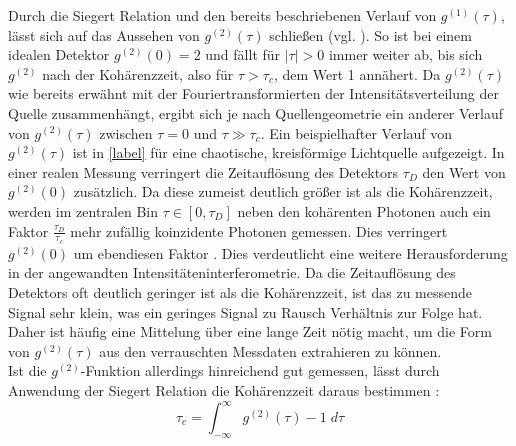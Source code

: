 Durch die Siegert Relation und den bereits beschriebenen Verlauf von $g^{(1)}(\tau)$, lässt sich auf das Aussehen von $g^{(2)}(\tau)$ schließen (vgl. \cite[Kap. 6.3]{foxQuantumOpticsIntroduction2006}). 
So ist bei einem idealen Detektor $g^{(2)}(0)=2$ und fällt für $|\tau|>0$ immer weiter ab, bis sich $g^{(2)}$ nach der Kohärenzzeit, also für $\tau>\tau_c$, dem Wert 1 annähert. 
Da $g^{(2)}(\tau)$ wie bereits erwähnt mit der Fouriertransformierten der Intensitätsverteilung der Quelle zusammenhängt, ergibt sich je nach Quellengeometrie ein anderer Verlauf von $g^{(2)}(\tau)$ zwischen $\tau=0$ und $\tau \gg \tau_c$. 
Ein beispielhafter Verlauf von $g^{(2)}(\tau)$ ist in \autoref{label} für eine chaotische, kreisförmige Lichtquelle aufgezeigt. 
In einer realen Messung verringert die Zeitauflösung des Detektors $\tau_D$ den Wert von $g^{(2)}(0)$ zusätzlich. 
Da diese zumeist deutlich größer ist als die Kohärenzzeit, werden im zentralen Bin $\tau \in [0, \tau_D]$ neben den kohärenten Photonen auch ein Faktor $\frac{\tau_D}{\tau_c}$ mehr zufällig koinzidente Photonen gemessen. 
Dies verringert $g^{(2)}(0)$ um ebendiesen Faktor \cite[Kap. 14.7]{mandelOpticalCoherenceQuantum1995}. 
Dies verdeutlicht eine weitere Herausforderung in der angewandten Intensitäteninterferometrie. 
Da die Zeitauflösung des Detektors oft deutlich geringer ist als die Kohärenzzeit, ist das zu messende Signal sehr klein, was ein geringes Signal zu Rausch Verhältnis zur Folge hat. 
Daher ist häufig eine Mittelung über eine lange Zeit nötig macht, um die Form von $g^{(2)}(\tau)$ aus den verrauschten Messdaten extrahieren zu können.\\ 

Ist die $g^{(2)}$-Funktion allerdings hinreichend gut gemessen, lässt durch Anwendung der Siegert Relation die Kohärenzzeit daraus bestimmen \cite[Eq. 14.7-2]{mandelOpticalCoherenceQuantum1995}:
\begin{equation}
    \tau_c = \int_{-\infty}^{\infty} g^{(2)}(\tau) - 1\;d\tau
\end{equation}

